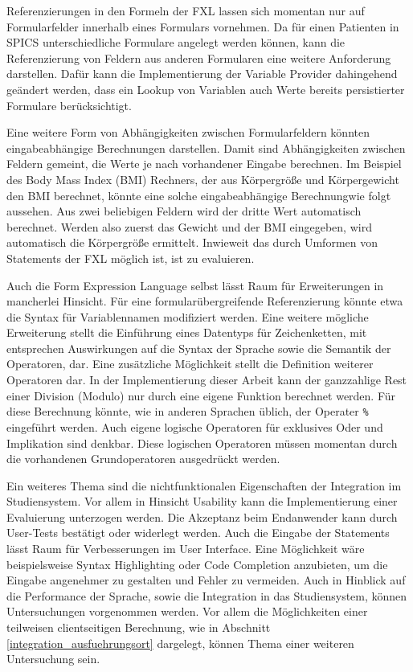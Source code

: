 Referenzierungen in den Formeln der FXL lassen sich momentan nur auf Formularfelder innerhalb eines Formulars vornehmen. Da für einen Patienten in SPICS unterschiedliche Formulare angelegt werden können, kann die Referenzierung von Feldern aus anderen Formularen eine weitere Anforderung darstellen. Dafür kann die Implementierung der Variable Provider dahingehend geändert werden, dass ein Lookup von Variablen auch Werte bereits persistierter Formulare berücksichtigt. 

Eine weitere Form von Abhängigkeiten zwischen Formularfeldern könnten eingabeabhängige Berechnungen darstellen. Damit sind Abhängigkeiten zwischen Feldern gemeint, die Werte je nach vorhandener Eingabe berechnen. Im Beispiel des Body Mass Index (BMI) Rechners, der aus Körpergröße und Körpergewicht den BMI berechnet, könnte eine solche eingabeabhängige Berechnungwie folgt aussehen. Aus zwei beliebigen Feldern wird der dritte Wert automatisch berechnet. Werden also zuerst das Gewicht und der BMI eingegeben, wird automatisch die Körpergröße ermittelt. Inwieweit das durch Umformen von Statements der FXL möglich ist, ist zu evaluieren.

Auch die Form Expression Language selbst lässt Raum für Erweiterungen in mancherlei Hinsicht. Für eine formularübergreifende Referenzierung könnte etwa die Syntax für Variablennamen modifiziert werden. Eine weitere mögliche Erweiterung stellt die Einführung eines Datentyps für Zeichenketten, mit entsprechen Auswirkungen auf die Syntax der Sprache sowie die Semantik der Operatoren, dar. Eine zusätzliche Möglichkeit stellt die Definition weiterer Operatoren dar. In der Implementierung dieser Arbeit kann der ganzzahlige Rest einer Division (Modulo) nur durch eine eigene Funktion berechnet werden. Für diese Berechnung könnte, wie in anderen Sprachen üblich, der Operater \texttt{\%} eingeführt werden. Auch eigene logische Operatoren für exklusives Oder und Implikation sind denkbar. Diese logischen Operatoren müssen momentan durch die vorhandenen Grundoperatoren ausgedrückt werden.

Ein weiteres Thema sind die nichtfunktionalen Eigenschaften der Integration im Studiensystem. Vor allem in Hinsicht Usability kann die Implementierung einer Evaluierung unterzogen werden. Die Akzeptanz beim Endanwender kann durch User-Tests bestätigt oder widerlegt werden. Auch die Eingabe der Statements lässt Raum für Verbesserungen im User Interface. Eine Möglichkeit wäre beispielsweise Syntax Highlighting oder Code Completion anzubieten, um die Eingabe angenehmer zu gestalten und Fehler zu vermeiden. Auch in Hinblick auf die Performance der Sprache, sowie die Integration in das Studiensystem, können Untersuchungen vorgenommen werden. Vor allem die Möglichkeiten einer teilweisen clientseitigen Berechnung, wie in Abschnitt \ref{integration_ausfuehrungsort} dargelegt, können Thema einer weiteren Untersuchung sein.

